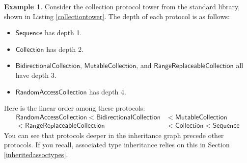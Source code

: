 \documentclass[a4paper,headsepline,bibliography=totoc,toc=flat,fleqn,twoside=semi]{scrbook}
\theoremstyle{definition}
\theoremstyle{definition}
\newtheorem{example}{Example}[chapter]
\theoremstyle{definition}
\newcommand{\proto}[1]{\bm{\mathsf{#1}}}
\begin{document}
\begin{example}
Consider the collection protocol tower from the standard library, shown in Listing \ref{collectiontower}. The depth of each protocol is as follows:
\begin{itemize}
\item $\proto{Sequence}$ has depth 1.
\item $\proto{Collection}$ has depth 2.
\item $\proto{BidirectionalCollection}$, $\proto{MutableCollection}$, and $\proto{RangeReplaceableCollection}$ all have depth 3.
\item $\proto{RandomAccessCollection}$ has depth 4.
\end{itemize}
Here is the linear order among these protocols:
\begin{align*}\proto{RandomAccessCollection}<\proto{BidirectionalCollection}&<\proto{MutableCollection}\\
<\proto{RangeReplaceableCollection}&<\proto{Collection}<\proto{Sequence}
\end{align*}
You can see that protocols deeper in the inheritance graph precede other protocols. If you recall, associated type inheritance relies on this in Section \ref{inheritedassoctypes}.
\end{example}
\end{document}
